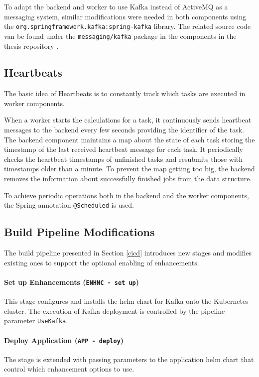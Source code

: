 To adapt the backend and worker to use Kafka instead of ActiveMQ as a messaging system, similar modifications were needed in both components using the \texttt{org.springframework.kafka:spring-kafka} library. The related source code van be found under the \texttt{messaging/kafka} package in the components in the thesis repository \cite{ThesisRepo}.

\subsection{Heartbeats}


The basic idea of Heartbeats is to constantly track which tasks are executed in worker components.

When a worker starts the calculations for a task, it continuously sends heartbeat messages to the backend every few seconds providing the identifier of the task. The backend component maintains a map about the state of each task storing the timestamp of the last received heartbeat message for each task. It periodically checks the heartbeat timestamps of unfinished tasks and resubmits those with timestamps older than a minute. To prevent the map getting too big, the backend removes the information about successfully finished jobs from the data structure.

To achieve periodic operations both in the backend and the worker components, the Spring annotation \texttt{@Scheduled} is used.


\subsection{Build Pipeline Modifications} \label{cicd-modifications}

The build pipeline presented in Section \ref{cicd} introduces new stages and modifies existing ones to support the optional enabling of enhancements.

\paragraph{Set up Enhancements (\texttt{ENHNC - set up})} This stage configures and installs the helm chart for Kafka onto the Kubernetes cluster. The execution of Kafka deployment is controlled by the pipeline parameter \texttt{UseKafka}.

\paragraph{Deploy Application (\texttt{APP - deploy})} The stage is extended with passing parameters to the application helm chart that control which enhancement options to use.




